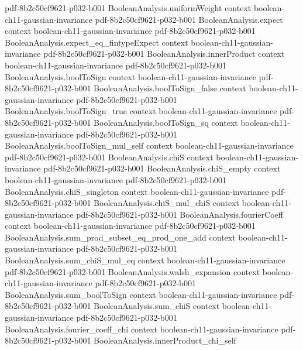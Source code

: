 \begin{theorem}
  {pdf-8b2c50cf9621-p032-b001}
\proofstep
  {BooleanAnalysis.uniformWeight}
  {context}
  {boolean-ch11-gaussian-invariance}
  {pdf-8b2c50cf9621-p032-b001}
\proofstep
  {BooleanAnalysis.expect}
  {context}
  {boolean-ch11-gaussian-invariance}
  {pdf-8b2c50cf9621-p032-b001}
\proofstep
  {BooleanAnalysis.expect_eq_fintypeExpect}
  {context}
  {boolean-ch11-gaussian-invariance}
  {pdf-8b2c50cf9621-p032-b001}
\proofstep
  {BooleanAnalysis.innerProduct}
  {context}
  {boolean-ch11-gaussian-invariance}
  {pdf-8b2c50cf9621-p032-b001}
\proofstep
  {BooleanAnalysis.boolToSign}
  {context}
  {boolean-ch11-gaussian-invariance}
  {pdf-8b2c50cf9621-p032-b001}
\proofstep
  {BooleanAnalysis.boolToSign_false}
  {context}
  {boolean-ch11-gaussian-invariance}
  {pdf-8b2c50cf9621-p032-b001}
\proofstep
  {BooleanAnalysis.boolToSign_true}
  {context}
  {boolean-ch11-gaussian-invariance}
  {pdf-8b2c50cf9621-p032-b001}
\proofstep
  {BooleanAnalysis.boolToSign_sq}
  {context}
  {boolean-ch11-gaussian-invariance}
  {pdf-8b2c50cf9621-p032-b001}
\proofstep
  {BooleanAnalysis.boolToSign_mul_self}
  {context}
  {boolean-ch11-gaussian-invariance}
  {pdf-8b2c50cf9621-p032-b001}
\proofstep
  {BooleanAnalysis.chiS}
  {context}
  {boolean-ch11-gaussian-invariance}
  {pdf-8b2c50cf9621-p032-b001}
\proofstep
  {BooleanAnalysis.chiS_empty}
  {context}
  {boolean-ch11-gaussian-invariance}
  {pdf-8b2c50cf9621-p032-b001}
\proofstep
  {BooleanAnalysis.chiS_singleton}
  {context}
  {boolean-ch11-gaussian-invariance}
  {pdf-8b2c50cf9621-p032-b001}
\proofstep
  {BooleanAnalysis.chiS_mul_chiS}
  {context}
  {boolean-ch11-gaussian-invariance}
  {pdf-8b2c50cf9621-p032-b001}
\proofstep
  {BooleanAnalysis.fourierCoeff}
  {context}
  {boolean-ch11-gaussian-invariance}
  {pdf-8b2c50cf9621-p032-b001}
\proofstep
  {BooleanAnalysis.sum_prod_subset_eq_prod_one_add}
  {context}
  {boolean-ch11-gaussian-invariance}
  {pdf-8b2c50cf9621-p032-b001}
\proofstep
  {BooleanAnalysis.sum_chiS_mul_eq}
  {context}
  {boolean-ch11-gaussian-invariance}
  {pdf-8b2c50cf9621-p032-b001}
\proofstep
  {BooleanAnalysis.walsh_expansion}
  {context}
  {boolean-ch11-gaussian-invariance}
  {pdf-8b2c50cf9621-p032-b001}
\proofstep
  {BooleanAnalysis.sum_boolToSign}
  {context}
  {boolean-ch11-gaussian-invariance}
  {pdf-8b2c50cf9621-p032-b001}
\proofstep
  {BooleanAnalysis.sum_chiS}
  {context}
  {boolean-ch11-gaussian-invariance}
  {pdf-8b2c50cf9621-p032-b001}
\proofstep
  {BooleanAnalysis.fourier_coeff_chi}
  {context}
  {boolean-ch11-gaussian-invariance}
  {pdf-8b2c50cf9621-p032-b001}
\proofstep
  {BooleanAnalysis.innerProduct_chi_self}

\end{theorem}
